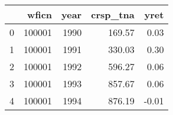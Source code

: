 \begin{tabular}{lrrrr}
\toprule
 & wficn & year & crsp_{tna} & yret \\
\midrule
0 & 100001 & 1990 & 169.57 & 0.03 \\
1 & 100001 & 1991 & 330.03 & 0.30 \\
2 & 100001 & 1992 & 596.27 & 0.06 \\
3 & 100001 & 1993 & 857.67 & 0.06 \\
4 & 100001 & 1994 & 876.19 & -0.01 \\
\bottomrule
\end{tabular}
